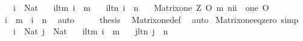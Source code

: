 \begin{isabellebody}
\ \ \ {\isachardoublequoteopen}i\ {\isacharcolon}{\kern0pt}\ Nat{\isachardoublequoteclose}\isanewline
\ \ \ i{\isacharunderscore}{\kern0pt}lt{\isacharunderscore}{\kern0pt}m{\isacharcolon}{\kern0pt}\ {\isachardoublequoteopen}i\ {\isacharless}{\kern0pt}\ m{\isachardoublequoteclose}\isanewline
\ \ \ i{\isacharunderscore}{\kern0pt}lt{\isacharunderscore}{\kern0pt}n{\isacharcolon}{\kern0pt}\ {\isachardoublequoteopen}i\ {\isacharless}{\kern0pt}\ n{\isachardoublequoteclose}\isanewline
\ \ \ {\isachardoublequoteopen}{\isacharparenleft}{\kern0pt}Matrix{\isacharunderscore}{\kern0pt}one\ Z\ O\ m\ n{\isacharparenright}{\kern0pt}{\isacharbackquote}{\kern0pt}i{\isacharbackquote}{\kern0pt}i\ {\isacharequal}{\kern0pt}\ one\ O{\isachardoublequoteclose}\isanewline
%
\isadelimproof
%
\endisadelimproof
%
\isatagproof
{}\isamarkupfalse%
\ {\isacharminus}{\kern0pt}\isanewline
\ \ \isamarkupfalse%
\ {\isachardoublequoteopen}i\ {\isasymin}\ {\isacharbrackleft}{\kern0pt}{}{\isacharcomma}{\kern0pt}{\isasymdots}{\isacharcomma}{\kern0pt}m{\isacharbrackleft}{\kern0pt}{\isachardoublequoteclose}\ \ {\isachardoublequoteopen}i\ {\isasymin}\ {\isacharbrackleft}{\kern0pt}{}{\isacharcomma}{\kern0pt}{\isasymdots}{\isacharcomma}{\kern0pt}n{\isacharbrackleft}{\kern0pt}{\isachardoublequoteclose}\ \isamarkupfalse%
\ auto\isanewline
\ \ \isamarkupfalse%
\ \isamarkupfalse%
\ {\isacharquery}{\kern0pt}thesis\ \isamarkupfalse%
\ Matrix{\isacharunderscore}{\kern0pt}one{\isacharunderscore}{\kern0pt}def\ \isamarkupfalse%
\ auto\isanewline
{}\isamarkupfalse%
%
\endisatagproof
{\isafoldproof}%
%
\isadelimproof
\isanewline
%
\endisadelimproof
\isanewline
{}\isamarkupfalse%
\ Matrix{\isacharunderscore}{\kern0pt}one{\isacharunderscore}{\kern0pt}eq{\isacharunderscore}{\kern0pt}zero\ {\isacharbrackleft}{\kern0pt}simp{\isacharbrackright}{\kern0pt}{\isacharcolon}{\kern0pt}\isanewline
\ \ \ {\isachardoublequoteopen}i\ {\isacharcolon}{\kern0pt}\ Nat{\isachardoublequoteclose}\ {\isachardoublequoteopen}j\ {\isacharcolon}{\kern0pt}\ Nat{\isachardoublequoteclose}\isanewline
\ \ \ i{\isacharunderscore}{\kern0pt}lt{\isacharunderscore}{\kern0pt}m{\isacharcolon}{\kern0pt}\ {\isachardoublequoteopen}i\ {\isacharless}{\kern0pt}\ m{\isachardoublequoteclose}\isanewline
\ \ \ j{\isacharunderscore}{\kern0pt}lt{\isacharunderscore}{\kern0pt}n{\isacharcolon}{\kern0pt}\ {\isachardoublequoteopen}j\ {\isacharless}{\kern0pt}\ n{\isachardoublequoteclose}\isanewline

\end{isabellebody}
